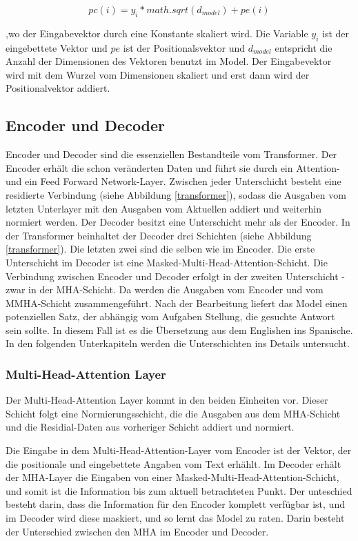 \begin{equation}
	pc(i) = y_i*math.sqrt(d_{model}) + pe(i)
\end{equation}

,wo der Eingabevektor durch eine Konstante skaliert wird. Die Variable $y_i$ ist der eingebettete Vektor und $pe$ ist der Positionalsvektor und $d_{model}$ entspricht die Anzahl der Dimensionen des Vektoren benutzt im Model. Der Eingabevektor wird mit dem Wurzel vom Dimensionen skaliert und erst dann wird der Positionalvektor addiert.

\subsection{Encoder und Decoder}

Encoder und Decoder sind die essenziellen Bestandteile vom Transformer. Der Encoder erhält die schon veränderten Daten und führt sie durch ein Attention- und ein Feed Forward Network-Layer. Zwischen jeder Unterschicht besteht eine residierte Verbindung (siehe Abbildung \ref{transformer}), sodass die Ausgaben vom letzten Unterlayer mit den Ausgaben vom Aktuellen addiert und weiterhin normiert werden. Der Decoder besitzt eine Unterschicht mehr als der Encoder. In der Transformer beinhaltet der Decoder drei Schichten (siehe Abbildung \ref{transformer}). Die letzten zwei sind die selben wie im Encoder. Die erste Unterschicht im Decoder ist eine Masked-Multi-Head-Attention-Schicht. Die Verbindung zwischen Encoder und Decoder erfolgt in der zweiten Unterschicht - zwar in der MHA-Schicht. Da werden die Ausgaben vom Encoder und vom MMHA-Schicht zusammengeführt. Nach der Bearbeitung liefert das Model einen potenziellen Satz, der abhängig vom Aufgaben Stellung, die gesuchte Antwort sein sollte. In diesem Fall ist es die Übersetzung aus dem Englishen ins Spanische. In den folgenden Unterkapiteln werden die Unterschichten ins Details untersucht.

\subsubsection{Multi-Head-Attention Layer}
Der Multi-Head-Attention Layer kommt in den beiden Einheiten vor. Dieser Schicht folgt eine Normierungsschicht, die die Ausgaben aus dem MHA-Schicht und die Residial-Daten aus vorheriger Schicht addiert und normiert.

Die Eingabe in dem Multi-Head-Attention-Layer vom Encoder ist der Vektor, der die positionale und eingebettete Angaben vom Text erhählt. Im Decoder erhält der MHA-Layer die Eingaben von einer Masked-Multi-Head-Attention-Schicht, und somit ist die Information bis zum aktuell betrachteten Punkt. Der unteschied besteht darin, dass die Information für den Encoder komplett verfügbar ist, und im Decoder wird diese maskiert, und so lernt das Model zu raten. Darin besteht der Unterschied zwischen den MHA im Encoder und Decoder. 

